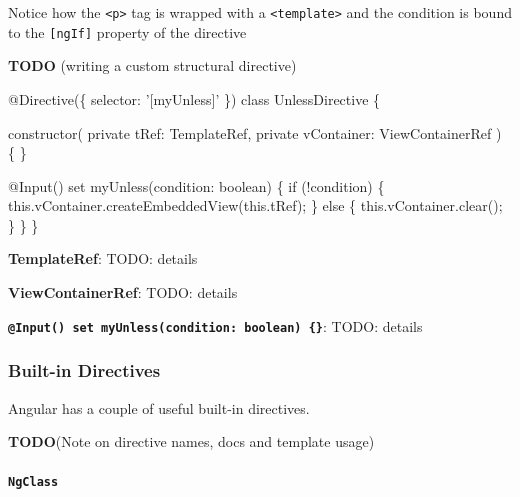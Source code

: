 \documentclass[12pt,]{article}
\newenvironment{Shaded}{}{}
\newcommand{\KeywordTok}[1]{\textcolor[rgb]{0.00,0.00,1.00}{{#1}}}
\newcommand{\DataTypeTok}[1]{{#1}}
\newcommand{\FunctionTok}[1]{{#1}}
\newcommand{\NormalTok}[1]{{#1}}
\let\oldparagraph\paragraph
\renewcommand{\paragraph}[1]{\oldparagraph{#1}\mbox{}}
\begin{document}
Notice how the \texttt{\textless{}p\textgreater{}} tag is wrapped with a
\texttt{\textless{}template\textgreater{}} and the condition is bound to
the \texttt{{[}ngIf{]}} property of the directive

\textbf{TODO} (writing a custom structural directive)

\begin{Shaded}
\begin{Highlighting}[numbers=left,,]
\FunctionTok{@Directive}\NormalTok{(\{}
  \NormalTok{selector: '[myUnless]'}
\NormalTok{\})}
\KeywordTok{class} \NormalTok{UnlessDirective \{}

  \FunctionTok{constructor}\NormalTok{(}
    \KeywordTok{private} \NormalTok{tRef: TemplateRef,}
    \KeywordTok{private} \NormalTok{vContainer: ViewContainerRef}
  \NormalTok{) \{ \}}

  \FunctionTok{@Input}\NormalTok{() set }\FunctionTok{myUnless}\NormalTok{(condition: }\DataTypeTok{boolean}\NormalTok{) \{}
    \KeywordTok{if} \NormalTok{(!condition) \{}
      \KeywordTok{this}\NormalTok{.}\FunctionTok{vContainer}\NormalTok{.}\FunctionTok{createEmbeddedView}\NormalTok{(}\KeywordTok{this}\NormalTok{.}\FunctionTok{tRef}\NormalTok{);}
    \NormalTok{\} }\KeywordTok{else} \NormalTok{\{}
      \KeywordTok{this}\NormalTok{.}\FunctionTok{vContainer}\NormalTok{.}\FunctionTok{clear}\NormalTok{();}
    \NormalTok{\}}
  \NormalTok{\}}
\NormalTok{\}}
\end{Highlighting}
\end{Shaded}

\textbf{TemplateRef}: TODO: details

\textbf{ViewContainerRef}: TODO: details

\textbf{\texttt{@Input()\ set\ myUnless(condition:\ boolean)\ \{\}}}:
TODO: details

\subsubsection{Built-in Directives}\label{built-in-directives}

Angular has a couple of useful built-in directives.

\textbf{TODO}(Note on directive names, docs and template usage)

\paragraph{\texorpdfstring{\texttt{NgClass}}{NgClass}}\label{ngclass}
\end{document}
